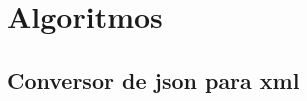 %

\chapter{Algoritmos}

\section{Conversor de \acrshort{json} para \acrshort{xml}}\label{exem:convXML}
